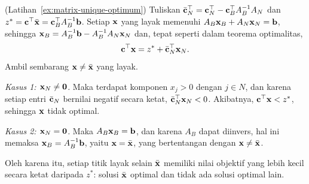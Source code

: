 \begin{solution}(Latihan~\ref{ex:matrix-unique-optimum})
Tuliskan \( \bar{\mathbf{c}}_N^\top = \mathbf{c}_N^\top - \mathbf{c}_B^\top A_B^{-1} A_N \) dan \( z^* = \mathbf{c}^\top \bar{\mathbf{x}} = \mathbf{c}_B^\top A_B^{-1} \mathbf{b} \).  Setiap \( \mathbf{x} \) yang layak memenuhi \( A_B \mathbf{x}_B + A_N \mathbf{x}_N = \mathbf{b} \), sehingga \( \mathbf{x}_B = A_B^{-1}\mathbf{b} - A_B^{-1}A_N \mathbf{x}_N \) dan, tepat seperti dalam teorema optimalitas,
\[
\mathbf{c}^\top \mathbf{x} = z^* + \bar{\mathbf{c}}_N^\top \mathbf{x}_N .
\]
Ambil sembarang \( \mathbf{x} \neq \bar{\mathbf{x}} \) yang layak.

\emph{Kasus 1: \( \mathbf{x}_N \neq \mathbf{0} \).}  Maka terdapat komponen \( x_j > 0 \) dengan \( j \in N \), dan karena setiap entri \( \bar{\mathbf{c}}_N \) bernilai negatif secara ketat, \( \bar{\mathbf{c}}_N^\top \mathbf{x}_N < 0 \).  Akibatnya, \( \mathbf{c}^\top \mathbf{x} < z^* \), sehingga \( \mathbf{x} \) tidak optimal.

\emph{Kasus 2: \( \mathbf{x}_N = \mathbf{0} \).}  Maka \( A_B \mathbf{x}_B = \mathbf{b} \), dan karena \( A_B \) dapat diinvers, hal ini memaksa \( \mathbf{x}_B = A_B^{-1}\mathbf{b} \), yaitu \( \mathbf{x} = \bar{\mathbf{x}} \), yang bertentangan dengan \( \mathbf{x} \neq \bar{\mathbf{x}} \).

Oleh karena itu, setiap titik layak selain \( \bar{\mathbf{x}} \) memiliki nilai objektif yang lebih kecil secara ketat daripada \( z^* \): solusi \( \bar{\mathbf{x}} \) optimal dan tidak ada solusi optimal lain.
\end{solution}
